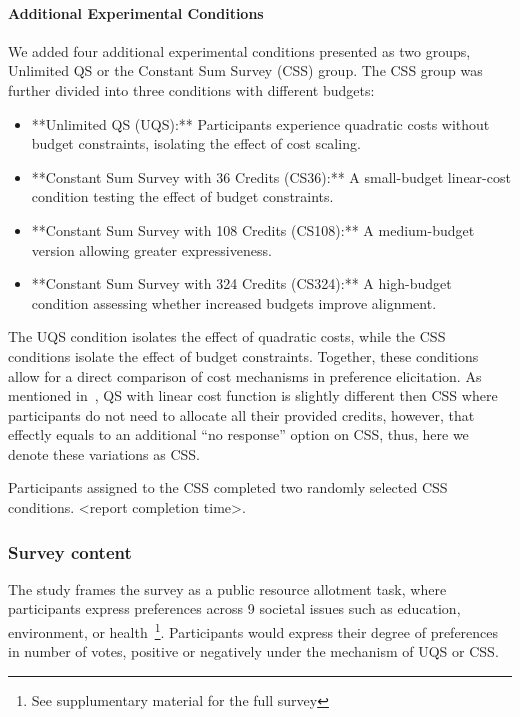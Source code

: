 \paragraph{Additional Experimental Conditions}
We added four additional experimental conditions presented as two groups, Unlimited QS or the Constant Sum Survey (CSS) group. The CSS group was further divided into three conditions with different budgets:

\begin{itemize}
    \item **Unlimited QS (UQS):** Participants experience quadratic costs without budget constraints, isolating the effect of cost scaling.
    \item **Constant Sum Survey with 36 Credits (CS36):** A small-budget linear-cost condition testing the effect of budget constraints.
    \item **Constant Sum Survey with 108 Credits (CS108):** A medium-budget version allowing greater expressiveness.
    \item **Constant Sum Survey with 324 Credits (CS324):** A high-budget condition assessing whether increased budgets improve alignment.
\end{itemize}

The UQS condition isolates the effect of quadratic costs, while the CSS conditions isolate the effect of budget constraints. Together, these conditions allow for a direct comparison of cost mechanisms in preference elicitation. As mentioned in~, QS with linear cost function is slightly different then CSS where participants do not need to allocate all their provided credits, however, that effectly equals to an additional ``no response'' option on CSS, thus, here we denote these variations as CSS.

Participants assigned to the CSS completed two randomly selected CSS conditions. <report completion time>.

\subsubsection{Survey content}
The study frames the survey as a public resource allotment task, where participants express preferences across 9 societal issues such as education, environment, or health~\footnote{See supplumentary material for the full survey}. Participants would express their degree of preferences in number of votes, positive or negatively under the mechanism of UQS or CSS.

